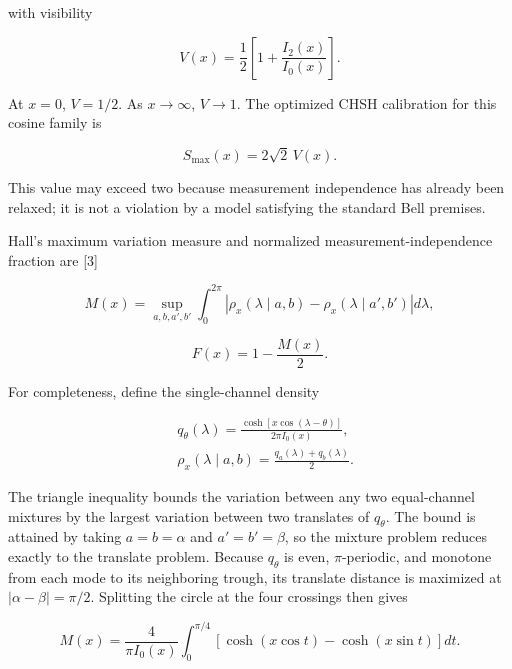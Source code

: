 \documentclass[
  american,
  11pt,
  letterpaper,
]{article}
\begin{document}
with visibility

\begin{equation}
V(x)=\frac12\left[1+\frac{I_2(x)}{I_0(x)}\right].
\tag{13}
\end{equation}

At \(x=0\), \(V=1/2\). As \(x\to\infty\), \(V\to1\). The optimized CHSH calibration for this cosine family is

\begin{equation}
S_{\max}(x)=2\sqrt{2}\,V(x).
\tag{14}
\end{equation}

This value may exceed two because measurement independence has already been relaxed; it is not a violation by a model satisfying the standard Bell premises.

Hall's maximum variation measure and normalized measurement-independence fraction are {[}3{]}

\begin{equation}
M(x)=\sup_{a,b,a',b'}\int_0^{2\pi}
\left|\rho_x(\lambda\mid a,b)-\rho_x(\lambda\mid a',b')\right|d\lambda,
\tag{15}
\end{equation}

\begin{equation}
F(x)=1-\frac{M(x)}{2}.
\tag{16}
\end{equation}

For completeness, define the single-channel density

\begin{equation}
\begin{aligned}
& q_\theta(\lambda)=
\frac{\cosh[x\cos(\lambda-\theta)]}{2\pi I_0(x)}, \\
& \rho_x(\lambda\mid a,b)=\frac{q_a(\lambda)+q_b(\lambda)}{2}.
\end{aligned}
\tag{17}
\end{equation}

The triangle inequality bounds the variation between any two equal-channel mixtures by the largest variation between two translates of \(q_\theta\). The bound is attained by taking \(a=b=\alpha\) and \(a'=b'=\beta\), so the mixture problem reduces exactly to the translate problem. Because \(q_\theta\) is even, \(\pi\)-periodic, and monotone from each mode to its neighboring trough, its translate distance is maximized at \(|\alpha-\beta|=\pi/2\). Splitting the circle at the four crossings then gives

\begin{equation}
M(x)=\frac{4}{\pi I_0(x)}\int_0^{\pi/4}
\left[\cosh(x\cos t)-\cosh(x\sin t)\right]dt .
\tag{18}
\end{equation}
\end{document}
